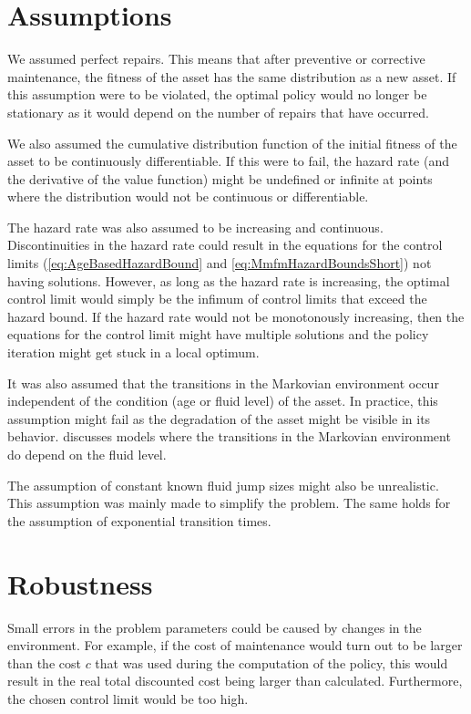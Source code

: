 \section{Assumptions}
We assumed perfect repairs.
This means that after preventive or corrective maintenance, the fitness of the asset has the same distribution as a new asset.
If this assumption were to be violated, the optimal policy would no longer be stationary as it would depend on the number of repairs that have occurred.

We also assumed the cumulative distribution function of the initial fitness of the asset to be continuously differentiable.
If this were to fail, the hazard rate (and the derivative of the value function) might be undefined or infinite at points where the distribution would not be continuous or differentiable.

The hazard rate was also assumed to be increasing and continuous.
Discontinuities in the hazard rate could result in the equations for the control limits (\eqref{eq:AgeBasedHazardBound} and \eqref{eq:MmfmHazardBoundsShort}) not having solutions.
However, as long as the hazard rate is increasing, the optimal control limit would simply be the infimum of control limits that exceed the hazard bound.
If the hazard rate would not be monotonously increasing, then the equations for the control limit might have multiple solutions and the policy iteration might get stuck in a local optimum.

It was also assumed that the transitions in the Markovian environment occur independent of the condition (age or fluid level) of the asset.
In practice, this assumption might fail as the degradation of the asset might be visible in its behavior.
\cite{Scheinhardt1998} discusses models where the transitions in the Markovian environment do depend on the fluid level.

The assumption of constant known fluid jump sizes might also be unrealistic.
This assumption was mainly made to simplify the problem.
The same holds for the assumption of exponential transition times.

\section{Robustness}
Small errors in the problem parameters could be caused by changes in the environment.
For example, if the cost of maintenance would turn out to be larger than the cost $c$ that was used during the computation of the policy, this would result in the real total discounted cost being larger than calculated.
Furthermore, the chosen control limit would be too high. 

